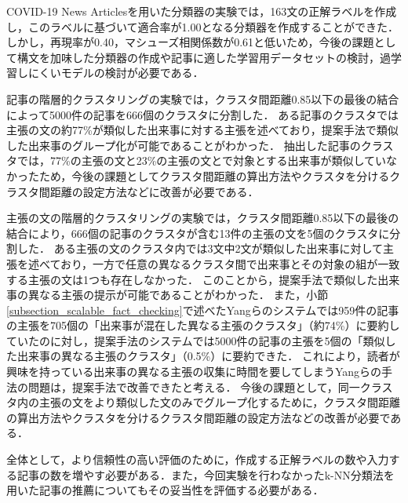 \documentclass[12pt,a4j]{jreport}
\begin{document}
COVID-19 News Articlesを用いた分類器の実験では，163文の正解ラベルを作成し，このラベルに基づいて適合率が1.00となる分類器を作成することができた．
しかし，再現率が0.40，マシューズ相関係数が0.61と低いため，今後の課題として構文を加味した分類器の作成や記事に適した学習用データセットの検討，過学習しにくいモデルの検討が必要である．

記事の階層的クラスタリングの実験では，クラスタ間距離0.85以下の最後の結合によって5000件の記事を666個のクラスタに分割した．
ある記事のクラスタでは主張の文の約77\%が類似した出来事に対する主張を述べており，提案手法で類似した出来事のグループ化が可能であることがわかった．
抽出した記事のクラスタでは，77\%の主張の文と23\%の主張の文とで対象とする出来事が類似していなかったため，今後の課題としてクラスタ間距離の算出方法やクラスタを分けるクラスタ間距離の設定方法などに改善が必要である．

主張の文の階層的クラスタリングの実験では，クラスタ間距離0.85以下の最後の結合により，666個の記事のクラスタが含む13件の主張の文を5個のクラスタに分割した．
ある主張の文のクラスタ内では3文中2文が類似した出来事に対して主張を述べており，一方で任意の異なるクラスタ間で出来事とその対象の組が一致する主張の文は1つも存在しなかった．
このことから，提案手法で類似した出来事の異なる主張の提示が可能であることがわかった．
また，小節\ref{subsection_scalable_fact_checking}で述べたYangらのシステムでは959件の記事の主張を705個の「出来事が混在した異なる主張のクラスタ」（約74\%）に要約していたのに対し，提案手法のシステムでは5000件の記事の主張を5個の「類似した出来事の異なる主張のクラスタ」（0.5\%）に要約できた．
これにより，読者が興味を持っている出来事の異なる主張の収集に時間を要してしまうYangらの手法の問題は，提案手法で改善できたと考える．
今後の課題として，同一クラスタ内の主張の文をより類似した文のみでグループ化するために，クラスタ間距離の算出方法やクラスタを分けるクラスタ間距離の設定方法などの改善が必要である．

全体として，より信頼性の高い評価のために，作成する正解ラベルの数や入力する記事の数を増やす必要がある．また，今回実験を行わなかったk-NN分類法を用いた記事の推薦についてもその妥当性を評価する必要がある．


\end{document}
